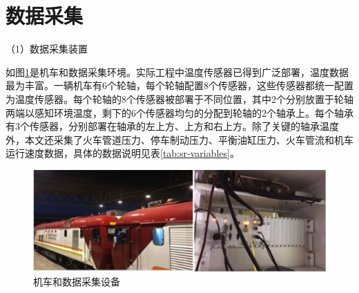 


\section{数据采集}


（1）数据采集装置

如图\ref{fig:sr-data-collect}是机车和数据采集环境。实际工程中温度传感器已得到广泛部署，温度数据最为丰富。一辆机车有6个轮轴，每个轮轴配置8个传感器，这些传感器都统一配置为温度传感器。每个轮轴的8个传感器被部署于不同位置，其中2个分别放置于轮轴两端以感知环境温度，剩下的6个传感器均匀的分配到轮轴的2个轴承上。每个轴承有3个传感器，分别部署在轴承的左上方、上方和右上方。除了关键的轴承温度外，本文还采集了火车管道压力、停车制动压力、平衡油缸压力、火车管流和机车运行速度数据，具体的数据说明见表\ref{tab:sr-variables}。

\begin{figure}[H]
\centering
\includegraphics[scale=0.5]{figures/sr-data-collect.png}
\caption{机车和数据采集设备}
\label{fig:sr-data-collect}
\end{figure}

